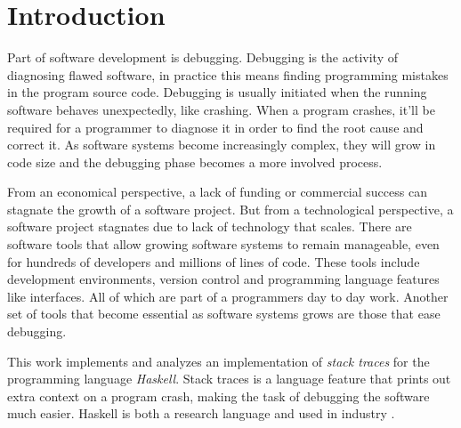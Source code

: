 \chapter{Introduction}

Part of software development is debugging. Debugging is the activity of
diagnosing flawed software, in practice this means finding programming mistakes
in the program source code. Debugging is usually initiated when the running
software behaves unexpectedly, like crashing. When a program crashes, it'll be
required for a programmer to diagnose it in order to find the root cause and
correct it. As software systems become increasingly complex, they will grow in
code size and the debugging phase becomes a more involved process.

From an economical perspective, a lack of funding or commercial success can
stagnate the growth of a software project. But from a technological perspective, a
software project stagnates due to lack of technology that scales. There are
software tools that allow growing software systems to remain manageable, even for
hundreds of developers and millions of lines of code. These tools include
development environments, version control and programming language features
like interfaces. All of which are part of a programmers day to day work.
Another set of tools that become essential as software systems grows are those
that ease debugging.

This work implements and analyzes an implementation of \emph{stack traces} for
the programming language \emph{Haskell}. Stack traces is a language feature
that prints out extra context on a program crash, making the task of debugging
the software much easier. Haskell is both a research language
\cite{haskell_org_research_papers}
\cite{dagit_getting_started_with_ghc_hacking} and used in industry
\cite{haskell_in_industry} \cite{fpcomplete_case_studies}.

